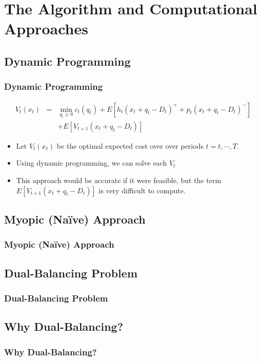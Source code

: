 \documentclass{beamer}
\begin{document}
  \section{The Algorithm and Computational Approaches}
    \subsection{Dynamic Programming}
    \begin{frame}
    \frametitle{Dynamic Programming}
      \begin{eqnarray*}
      V_{t}\left(x_{t}\right) & = & \min_{q_{t}\geq0}c_{t}\left(q_{t}\right)+E\left[h_{t}\left(x_{t}+q_{t}-D_{t}\right)^{+}+p_{t}\left(x_{t}+q_{t}-D_{t}\right)^{-}\right]\\
       &  & + E\left[V_{t+1}\left(x_{t}+q_{t}-D_{t}\right)\right]
      \end{eqnarray*}
      \begin{itemize}
        \item Let $V_{t}\left(x_{t}\right)$ be the optimal expected cost over over periods $t=t,\cdots,T.$
        \item Using dynamic programming, we can solve each $V_{t}$
        \item This approach would be accurate if it were feasible, but the term $E\left[V_{t+1}\left(x_{t}+q_{t}-D_{t}\right)\right]$ is very difficult to compute.
      \end{itemize}
    \end{frame}

    \subsection{Myopic (Na{\"i}ve) Approach}
    \begin{frame}
    \frametitle{Myopic (Na{\"i}ve) Approach}

    \end{frame}

    \subsection{Dual-Balancing Problem}
    \begin{frame}
    \frametitle{Dual-Balancing Problem}

    \end{frame}

    \subsection{Why Dual-Balancing?}
    \begin{frame}
    \frametitle{Why Dual-Balancing?}

    \end{frame}
\end{document}
